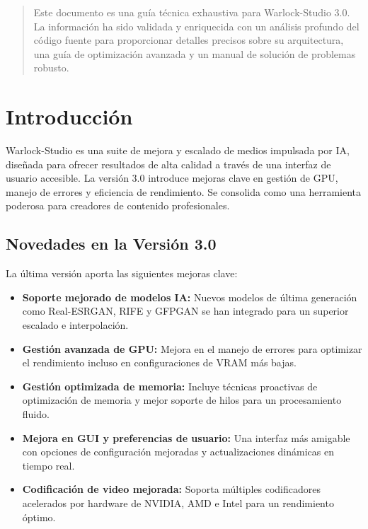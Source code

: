 \documentclass[11pt, a4paper]{article}
\begin{document}
\pagestyle{fancy} %

\begin{abstract}
\noindent %
Este documento es una guía técnica exhaustiva para Warlock-Studio 3.0. La información ha sido validada y enriquecida con un análisis profundo del código fuente para proporcionar detalles precisos sobre su arquitectura, una guía de optimización avanzada y un manual de solución de problemas robusto.
\end{abstract}

\newpage %
\tableofcontents %
\newpage %



\section{Introducción}
Warlock-Studio es una suite de mejora y escalado de medios impulsada por IA, diseñada para ofrecer resultados de alta calidad a través de una interfaz de usuario accesible. La versión 3.0 introduce mejoras clave en gestión de GPU, manejo de errores y eficiencia de rendimiento. Se consolida como una herramienta poderosa para creadores de contenido profesionales.

\subsection{Novedades en la Versión 3.0}
La última versión aporta las siguientes mejoras clave:
\begin{itemize}[leftmargin=*]
    \item \textbf{Soporte mejorado de modelos IA:} Nuevos modelos de última generación como Real-ESRGAN, RIFE y GFPGAN se han integrado para un superior escalado e interpolación.
    \item \textbf{Gestión avanzada de GPU:} Mejora en el manejo de errores para optimizar el rendimiento incluso en configuraciones de VRAM más bajas.
    \item \textbf{Gestión optimizada de memoria:} Incluye técnicas proactivas de optimización de memoria y mejor soporte de hilos para un procesamiento fluido.
    \item \textbf{Mejora en GUI y preferencias de usuario:} Una interfaz más amigable con opciones de configuración mejoradas y actualizaciones dinámicas en tiempo real.
    \item \textbf{Codificación de video mejorada:} Soporta múltiples codificadores acelerados por hardware de NVIDIA, AMD e Intel para un rendimiento óptimo.
\end{itemize}
\end{document}
